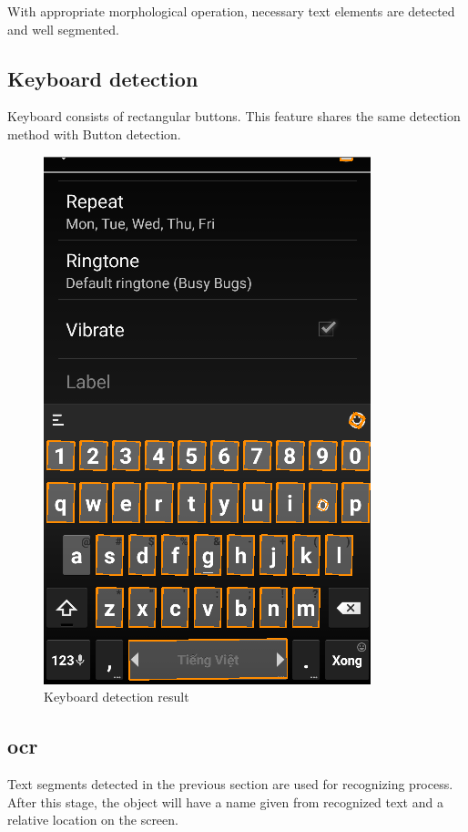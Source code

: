 With appropriate morphological operation, necessary text elements are detected and well segmented.

\subsection{Keyboard detection}
Keyboard consists of rectangular buttons. This feature shares the same detection method with Button detection.

	\begin{figure}[H]
		\centering
		\includegraphics[scale=0.65]{Chapters/Fig/kb_detect.png}
		\caption{Keyboard detection result}
		\label{fig:kb_detect}
	\end{figure}



\subsection{\acrlong{ocr}}
Text segments detected in the previous section are used for recognizing process. After this stage, the object will have a name given from recognized text and a relative location on the screen.

